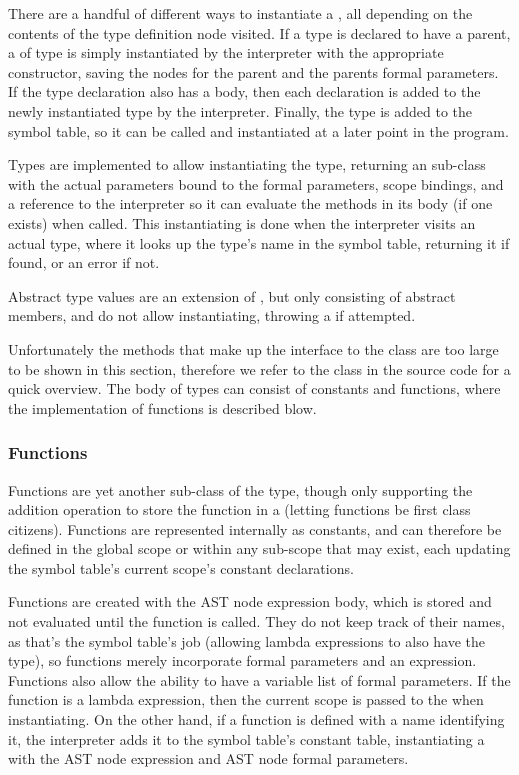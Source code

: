 There are a handful of different ways to instantiate a ,
all depending on the contents of the type definition node visited.
If a type is declared to have a parent, a  of type
 is simply instantiated by the interpreter with the
appropriate constructor, saving the nodes for the parent and the parents
formal parameters. If the type declaration also has a body, then each
declaration is added to the newly instantiated type by the interpreter.
Finally, the type is added to the symbol table, so it can be called and
instantiated at a later point in the program.

Types are implemented to allow instantiating the type, returning an
 sub-class with the actual parameters bound to the
formal parameters, scope bindings, and a reference to the interpreter
so it can evaluate the methods in its body (if one exists) when called.
This instantiating is done when the interpreter visits an actual type,
where it looks up the type's name in the symbol table, returning it if
found, or an error if not.

Abstract type values are an extension of , but only
consisting of abstract members, and do not allow instantiating, throwing
a  if attempted.

Unfortunately the methods that make up the interface to the
 class are too large to be shown in this section,
therefore we refer to the  class in the source code
for a quick overview. The body of types can consist of constants and
functions, where the implementation of functions is described blow.

\subsubsection{Functions}
Functions are yet another sub-class of the  type,
though only supporting the addition operation to store the function in
a  (letting functions be first class citizens).
Functions are represented internally as constants, and can therefore be
defined in the global scope or within any sub-scope that may exist, each
updating the symbol table's current scope's constant declarations.

Functions are created with the AST node expression body, which is
stored and not evaluated until the function is called. They do not keep
track of their names, as that's the symbol table's job (allowing lambda
expressions to also have the  type), so functions
merely incorporate formal parameters and an expression. Functions also
allow the ability to have a variable list of formal parameters. If the
function is a lambda expression, then the current scope is passed to the
 when instantiating. On the other hand, if a function
is defined with a name identifying it, the interpreter adds it to the
symbol table's constant table, instantiating a  with
the AST node expression and AST node formal parameters.

